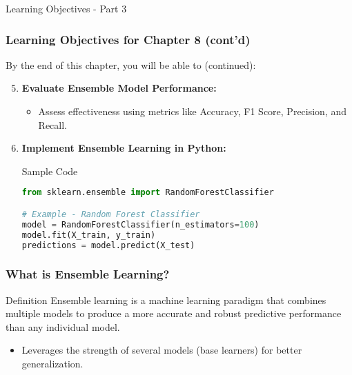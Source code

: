 \documentclass[aspectratio=169]{beamer}
\begin{document}
\begin{frame}[fragile]{Learning Objectives - Part 3}
    \frametitle{Learning Objectives for Chapter 8 (cont'd)}
    By the end of this chapter, you will be able to (continued):
    \begin{enumerate}
        \setcounter{enumi}{4}
        \item \textbf{Evaluate Ensemble Model Performance:}
        \begin{itemize}
            \item Assess effectiveness using metrics like Accuracy, F1 Score, Precision, and Recall.
        \end{itemize}
        
        \item \textbf{Implement Ensemble Learning in Python:}
        \begin{block}{Sample Code}
        \begin{lstlisting}[language=Python]
from sklearn.ensemble import RandomForestClassifier

# Example - Random Forest Classifier
model = RandomForestClassifier(n_estimators=100)
model.fit(X_train, y_train)
predictions = model.predict(X_test)
        \end{lstlisting}
        \end{block}
    \end{enumerate}
\end{frame}

\begin{frame}[fragile]
    \frametitle{What is Ensemble Learning?}
    \begin{block}{Definition}
        Ensemble learning is a machine learning paradigm that combines multiple models to produce a more accurate and robust predictive performance than any individual model.
    \end{block}
    \begin{itemize}
        \item Leverages the strength of several models (base learners) for better generalization.
    \end{itemize}
\end{frame}
\end{document}
